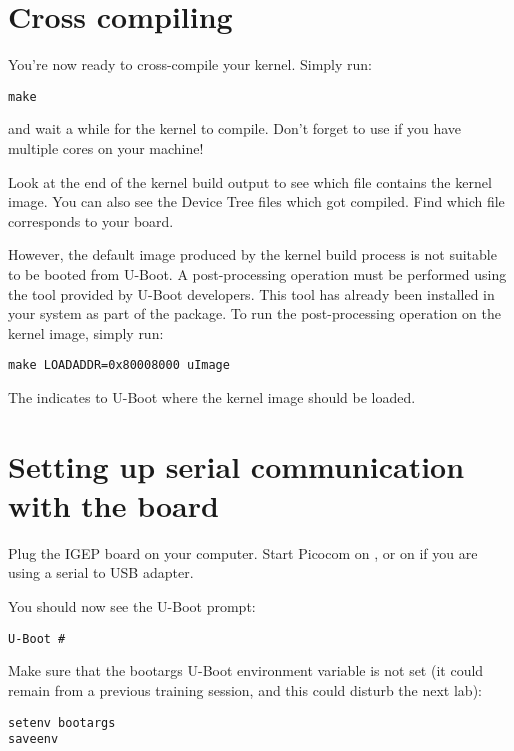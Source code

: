 \section{Cross compiling}

You're now ready to cross-compile your kernel. Simply run:

\begin{verbatim}
make
\end{verbatim}

and wait a while for the kernel to compile. Don't forget to use
 if you have multiple cores on your machine!

Look at the end of the kernel build output to see which file contains
the kernel image. You can also see the Device Tree  files
which got compiled. Find which  file corresponds to your
board.

However, the default image produced by the kernel build process is not
suitable to be booted from U-Boot. A post-processing operation must be
performed using the  tool provided by U-Boot developers. This
tool has already been installed in your system as part of the
 package. To run the post-processing operation on
the kernel image, simply run:

\begin{verbatim}
make LOADADDR=0x80008000 uImage
\end{verbatim}

The  indicates to U-Boot where the kernel image should
be loaded.

\section{Setting up serial communication with the board}

Plug the IGEP board on your computer. Start Picocom on
, or on  if you are using a serial
to USB adapter.

You should now see the U-Boot prompt:

\begin{verbatim}
U-Boot #
\end{verbatim}

Make sure that the bootargs U-Boot environment variable is not set (it
could remain from a previous training session, and this could disturb
the next lab):

\begin{verbatim}
setenv bootargs
saveenv
\end{verbatim}

